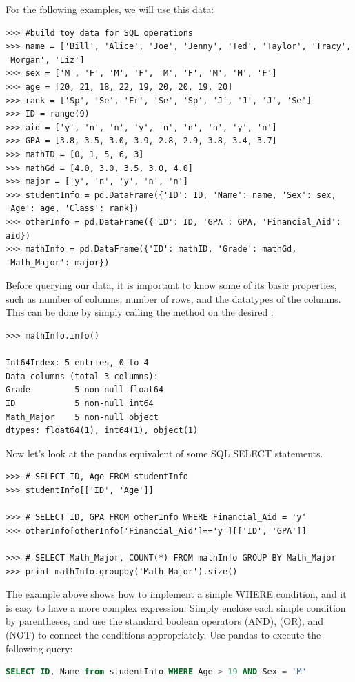 For the following examples, we will use this data:
\begin{lstlisting}
>>> #build toy data for SQL operations
>>> name = ['Bill', 'Alice', 'Joe', 'Jenny', 'Ted', 'Taylor', 'Tracy', 'Morgan', 'Liz']
>>> sex = ['M', 'F', 'M', 'F', 'M', 'F', 'M', 'M', 'F']
>>> age = [20, 21, 18, 22, 19, 20, 20, 19, 20]
>>> rank = ['Sp', 'Se', 'Fr', 'Se', 'Sp', 'J', 'J', 'J', 'Se']
>>> ID = range(9)
>>> aid = ['y', 'n', 'n', 'y', 'n', 'n', 'n', 'y', 'n']
>>> GPA = [3.8, 3.5, 3.0, 3.9, 2.8, 2.9, 3.8, 3.4, 3.7]
>>> mathID = [0, 1, 5, 6, 3]
>>> mathGd = [4.0, 3.0, 3.5, 3.0, 4.0]
>>> major = ['y', 'n', 'y', 'n', 'n']
>>> studentInfo = pd.DataFrame({'ID': ID, 'Name': name, 'Sex': sex, 'Age': age, 'Class': rank})
>>> otherInfo = pd.DataFrame({'ID': ID, 'GPA': GPA, 'Financial_Aid': aid})
>>> mathInfo = pd.DataFrame({'ID': mathID, 'Grade': mathGd, 'Math_Major': major})
\end{lstlisting}

Before querying our data, it is important to know some of its basic properties, such as
number of columns, number of rows, and the datatypes of the columns. This can be done
by simply calling the  method on the desired :
\begin{lstlisting}
>>> mathInfo.info()

Int64Index: 5 entries, 0 to 4
Data columns (total 3 columns):
Grade         5 non-null float64
ID            5 non-null int64
Math_Major    5 non-null object
dtypes: float64(1), int64(1), object(1)
\end{lstlisting}

Now let's look at the pandas equivalent of some SQL SELECT statements.
\begin{lstlisting}
>>> # SELECT ID, Age FROM studentInfo
>>> studentInfo[['ID', 'Age']]

>>> # SELECT ID, GPA FROM otherInfo WHERE Financial_Aid = 'y'
>>> otherInfo[otherInfo['Financial_Aid']=='y'][['ID', 'GPA']]

>>> # SELECT Math_Major, COUNT(*) FROM mathInfo GROUP BY Math_Major
>>> print mathInfo.groupby('Math_Major').size()
\end{lstlisting}

\begin{problem}
The example above shows how to implement a simple WHERE condition, and it is easy
to have a more complex expression. Simply enclose each simple condition by parentheses,
and use the standard boolean operators \li{\&} (AND), \li{\|} (OR), and \li{\~} (NOT) to
connect the conditions appropriately. Use pandas to execute the following query:
\begin{lstlisting}[language=SQL]
SELECT ID, Name from studentInfo WHERE Age > 19 AND Sex = 'M'
\end{lstlisting}
\end{problem}

